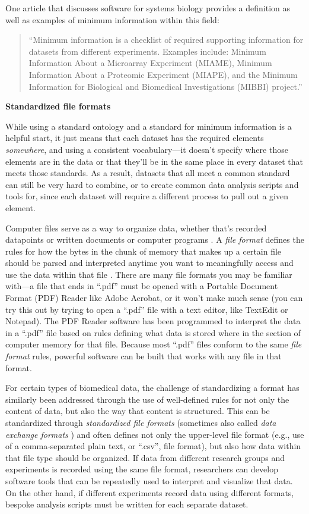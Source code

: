 \documentclass[]{tufte-book}
\begin{document}
One article that discusses software for systems biology provides a definition
as well as examples of minimum information within this field:

\begin{quote}
``Minimum information is a checklist of required supporting information for
datasets from different experiments. Examples include: Minimum Information About
a Microarray Experiment (MIAME), Minimum Information About a Proteomic
Experiment (MIAPE), and the Minimum Information for Biological and Biomedical
Investigations (MIBBI) project.'' \citep{ghosh2011software}
\end{quote}

\textbf{Standardized file formats}

While using a standard ontology and a standard for minimum information is a
helpful start, it just means that each dataset has the required elements
\emph{somewhere}, and using a consistent vocabulary---it doesn't specify where those
elements are in the data or that they'll be in the same place in every dataset
that meets those standards. As a result, datasets that all meet a common
standard can still be very hard to combine, or to create common data analysis
scripts and tools for, since each dataset will require a different process to
pull out a given element.

Computer files serve as a way to organize data, whether that's recorded
datapoints or written documents or computer programs \citep{kernighan1984unix}. A
\emph{file format} defines the rules for how the bytes in the chunk of memory that
makes up a certain file should be parsed and interpreted anytime you want to
meaningfully access and use the data within that file
\citep{murrell2009introduction}. There are many file formats you may be familiar
with---a file that ends in ``.pdf'' must be opened with a Portable Document Format
(PDF) Reader like Adobe Acrobat, or it won't make much sense (you can try this
out by trying to open a ``.pdf'' file with a text editor, like TextEdit or
Notepad). The PDF Reader software has been programmed to interpret the data in a
``.pdf'' file based on rules defining what data is stored where in the section of
computer memory for that file. Because most ``.pdf'' files conform to the same
\emph{file format} rules, powerful software can be built that works with any file in
that format.

For certain types of biomedical data, the challenge of standardizing a format
has similarly been addressed through the use of well-defined rules for not only
the content of data, but also the way that content is structured. This can be
standardized through \emph{standardized file formats} (sometimes also called \emph{data
exchange formats} \citep{brazma2006standards}) and often defines not only the
upper-level file format (e.g., use of a comma-separated plain text, or ``.csv'',
file format), but also how data within that file type should be organized. If data
from different research groups and experiments is recorded using the same file
format, researchers can develop software tools that can be repeatedly used to
interpret and visualize that data. On the other hand, if different experiments
record data using different formats, bespoke analysis scripts must be written
for each separate dataset.
\end{document}

